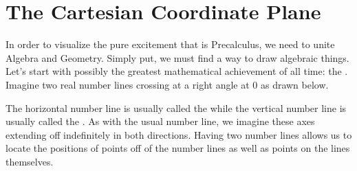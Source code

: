 \section{The Cartesian Coordinate Plane}
\label{CartesianPlane}

In order to visualize the pure excitement that is Precalculus, we need to unite Algebra and Geometry.  Simply put, we must find a way to draw algebraic things.  Let's start with possibly the greatest mathematical achievement of all time: the  .
Imagine two real number lines crossing at a right angle at $0$ as drawn below.


\begin{center}


\end{center}

\medskip

The horizontal number line is usually called the   while the vertical number line is usually called the  .  As with the usual number line, we imagine these axes extending off indefinitely in both directions.   Having two number lines allows us to locate the positions of points off of the number lines as well as points on the lines themselves.  




\medskip

